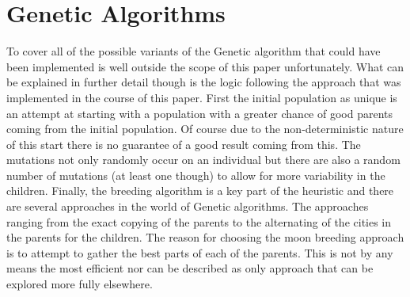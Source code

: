 \documentclass[midd]{thesis}
\newcommand{\tab}{\hspace*{2em}}
\begin{document}
\section{Genetic Algorithms}
\tab To cover all of the possible variants of the Genetic algorithm that could have been implemented is well outside the scope of this paper unfortunately. What can be explained in further detail though is the logic following the approach that was implemented in the course of this paper. First the initial population as unique is an attempt at starting with a population with a greater chance of good parents coming from the initial population. Of course due to the non-deterministic nature of this start there is no guarantee of a good result coming from this. The mutations not only randomly occur on an individual but there are also a random number of mutations (at least one though) to allow for more variability in the children. Finally, the breeding algorithm is a key part of the heuristic and there are several approaches in the world of Genetic algorithms. The approaches ranging from the exact copying of the parents to the alternating of the cities in the parents for the children. The reason for choosing the moon breeding approach is to attempt to gather the best parts of each of the parents. This is not by any means the most efficient nor can be described as only approach that can be explored more fully elsewhere.\\
\end{document}
